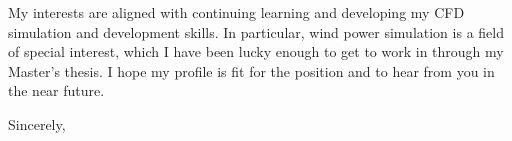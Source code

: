 \documentclass{letter}
\newcommand{\thesisname}{Parametric analysis of disk actuators models to simulate wind farms}
\begin{document}
\begin{letter}{}
  My interests are aligned with continuing learning and developing my CFD simulation and development skills. 
  In particular, wind power simulation is a field of special interest, which I have been lucky enough to get to work in through my Master's thesis. 
  I hope my profile is fit for the position and to hear from you in the near future.




\closing{Sincerely,}
\end{letter}
\end{document}
